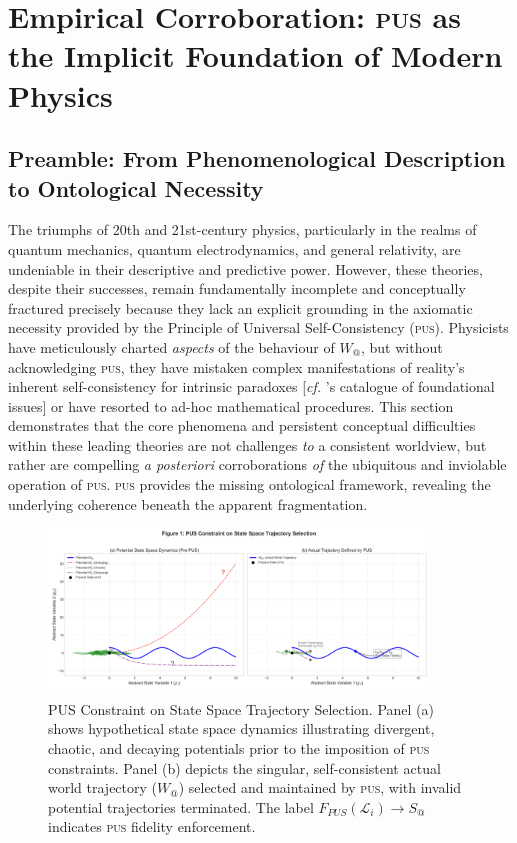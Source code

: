 \documentclass[11pt, a4paper]{article}
\makeatletter
\newcommand{\pus}{\textsc{pus}} %
\newcommand{\Wactual}{W_{@}} %
\makeatother
\begin{document}
\FloatBarrier

\section{Empirical Corroboration: \pus{} as the Implicit Foundation of Modern Physics}

\subsection{Preamble: From Phenomenological Description to Ontological Necessity}
The triumphs of 20th and 21st-century physics, particularly in the realms of quantum mechanics, quantum electrodynamics, and general relativity, are undeniable in their descriptive and predictive power. However, these theories, despite their successes, remain fundamentally incomplete and conceptually fractured precisely because they lack an explicit grounding in the axiomatic necessity provided by the Principle of Universal Self-Consistency (\pus). Physicists have meticulously charted \textit{aspects} of the behaviour of $\Wactual$, but without acknowledging \pus, they have mistaken complex manifestations of reality's inherent self-consistency for intrinsic paradoxes [\textit{cf.} \citealp{penrose2004}'s catalogue of foundational issues] or have resorted to ad-hoc mathematical procedures. This section demonstrates that the core phenomena and persistent conceptual difficulties within these leading theories are not challenges \textit{to} a consistent worldview, but rather are compelling \textit{a posteriori} corroborations \textit{of} the ubiquitous and inviolable operation of \pus. \pus{} provides the missing ontological framework, revealing the underlying coherence beneath the apparent fragmentation.

\begin{figure}[htbp]
    \centering
    \includegraphics[width=0.9\textwidth]{figures/pus_figure1_state_selection.png} %
    \caption{PUS Constraint on State Space Trajectory Selection. Panel (a) shows hypothetical state space dynamics illustrating divergent, chaotic, and decaying potentials prior to the imposition of \pus{} constraints. Panel (b) depicts the singular, self-consistent actual world trajectory ($\Wactual$) selected and maintained by \pus{}, with invalid potential trajectories terminated. The label $F_{PUS}(\mathcal{L}_i) \rightarrow S_{@}$ indicates \pus{} fidelity enforcement.}
    \label{fig:trajectory}
\end{figure}
\FloatBarrier 
\end{document}
